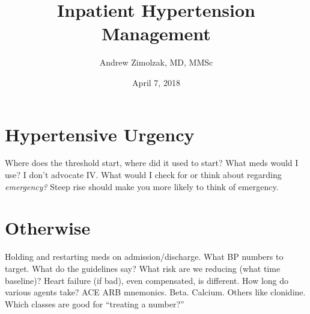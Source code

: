 \documentclass{tufte-handout}
\title{Inpatient Hypertension Management}
\author{Andrew Zimolzak, MD, MMSc}
\date{April 7, 2018}
\begin{document}
\maketitle


\section{Hypertensive Urgency}

Where does the threshold start, where did it used to start?
What meds would I use? I
don't advocate IV. What would I check for or think about regarding
\emph{emergency?} Steep rise should make you more likely to think of
emergency.


\section{Otherwise}

Holding and restarting meds on admission/discharge.
What BP numbers to target. What do the guidelines
say? What risk are we reducing (what time baseline)?
Heart failure (if bad), even compensated, is different.
How long do various agents take? ACE ARB mnemonics. Beta. Calcium.
Others like clonidine. Which classes are good for ``treating a number?''
\end{document}

